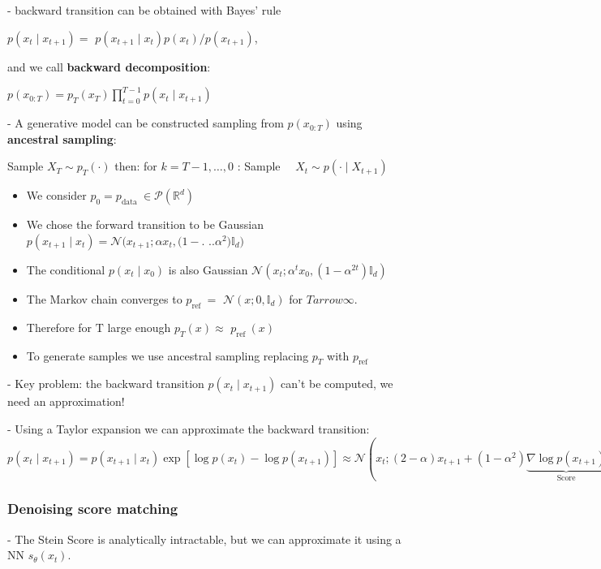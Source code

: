 - backward transition can be obtained with Bayes' rule 

$p(x_{t} \mid x_{t+1})=$ $p(x_{t+1} \mid x_{t}) p(x_{t}) / p(x_{t+1})$, 

and we call \textbf{backward decomposition}:

$
p(x_{0: T})=p_{T}(x_{T}) \prod_{t=0}^{T-1} p(x_{t} \mid x_{t+1})
$

- A generative model can be constructed sampling from $p(x_{0: T})$ using \textbf{ancestral sampling}:

Sample $X_{T} \sim p_{T}(\cdot)$ then:
for $k=T-1, \ldots, 0$ :
Sample $\quad X_{t} \sim p(\cdot \mid X_{t+1})$

\begin{itemize}
  \item We consider $p_{0}=p_{\text {data }} \in \mathcal{P}(\mathbb{R}^{d})$

  \item We chose the forward transition to be Gaussian $p(x_{t+1} \mid x_{t})=\mathcal{N}(x_{t+1} ; \alpha x_{t},(1-.$ $..\alpha^{2}) \mathbb{I}_{d})$

  \item The conditional $p(x_{t} \mid x_{0})$ is also Gaussian $\mathcal{N}(x_{t} ; \alpha^{t} x_{0},(1-\alpha^{2 t}) \mathbb{I}_{d})$

  \item The Markov chain converges to $p_{\text {ref }}=$ $\mathcal{N}(x ; 0, \mathbb{I}_{d})$ for $T arrow \infty$.

  \item Therefore for $\mathrm{T}$ large enough $p_{T}(x) \approx$ $p_{\text {ref }}(x)$

  \item To generate samples we use ancestral sampling replacing $p_{T}$ with $p_{\text {ref}}$

\end{itemize}

- Key problem: the backward transition $p(x_{t} \mid x_{t+1})$ can't be computed, we need an approximation!

- Using a Taylor expansion we can approximate the backward transition:
$p(x_{t} \mid x_{t+1})=p(x_{t+1} \mid x_{t}) \exp [\log p(x_{t})-\log p(x_{t+1})] \approx \mathcal{N}(x_{t} ;(2-\alpha) x_{t+1}+(1-\alpha^{2}) \underbrace{\nabla \log p(x_{t+1})}_{\text{Score}},(1-\alpha^{2}) \mathbb{I}_{d})$


\subsubsection*{Denoising score matching}
- The Stein Score is analytically intractable, but we can approximate it using a NN $s_{\theta}(x_{t})$. 

